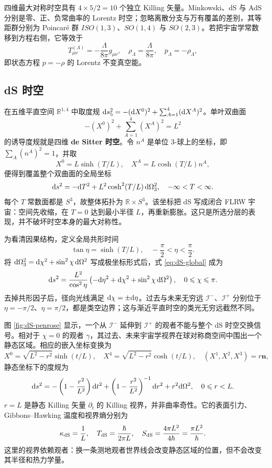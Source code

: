 四维最大对称时空具有 $4\times5/2=10$ 个独立 Killing 矢量。Minkowski、dS 与 AdS 分别是零、正、负常曲率的 Lorentz 时空；忽略离散分支与万有覆盖的差别，其等距群分别为 Poincar\'e 群 $ISO(1,3)$、$SO(1,4)$ 与 $SO(2,3)$。若把宇宙学常数移到方程右侧，它等效于
\[
    T^{(\Lambda)}_{\mu\nu}=-\frac{\Lambda}{8\pi}g_{\mu\nu},
    \quad
    \rho_\Lambda=\frac{\Lambda}{8\pi},\quad
    p_\Lambda=-\rho_\Lambda,
\]
即状态方程 $p=-\rho$ 的 Lorentz 不变真空能。

\subsection{dS 时空}

在五维平直空间 $\mathbb R^{1,4}$ 中取度规
$\dd s_5^2=-(\dd X^0)^2+\sum_{A=1}^4(\dd X^A)^2$。单叶双曲面
\begin{equation}\label{eq:dS-embedding}
    -(X^0)^2+\sum_{A=1}^4(X^A)^2=L^2
\end{equation}
的诱导度规就是四维 \textbf{de Sitter 时空}。令 $n^A$ 是单位 3-球上的坐标，即 $\sum_A(n^A)^2=1$，并取
\[
    X^0=L\sinh(T/L),\quad
    X^A=L\cosh(T/L)n^A,
\]
便得到覆盖整个双曲面的全局坐标
\begin{equation}\label{eq:dS-global}
    \dd s^2=-\dd T^2+L^2\cosh^2(T/L)\,\dd\Omega_3^2,
    \quad -\infty<T<\infty.
\end{equation}
每个 $T$ 常数面都是 $S^3$，故整体拓扑为 $\mathbb R\times S^3$。该坐标把 dS 写成闭合 FLRW 宇宙：空间先收缩，在 $T=0$ 达到最小半径 $L$，再重新膨胀。这只是所选分层的表现，并不破坏时空本身的最大对称性。

为看清因果结构，定义全局共形时间
\[
    \tan\eta=\sinh(T/L),\quad
    -\frac\pi2<\eta<\frac\pi2.
\]
将 $\dd\Omega_3^2=\dd\chi^2+\sin^2\chi\,\dd\Omega^2$ 写成极坐标形式后，式 \eqref{eq:dS-global} 成为
\begin{equation}
    \dd s^2=\frac{L^2}{\cos^2\eta}
      \left(-\dd\eta^2+\dd\chi^2+\sin^2\chi\,\dd\Omega^2\right),
    \quad 0\leqslant\chi\leqslant\pi.
\end{equation}
去掉共形因子后，径向光线满足 $\dd\chi=\pm\dd\eta$。过去与未来无穷远 $\mathscr I^-$、$\mathscr I^+$ 分别位于 $\eta=-\pi/2$、$\eta=\pi/2$，都是类空边界；这与渐近平直时空的类光无穷远截然不同。

图 \ref{fig:dS-penrose} 显示，一个从 $\mathscr I^-$ 延伸到 $\mathscr I^+$ 的观者不能与整个 dS 时空交换信号。相对于 $\chi=0$ 的观者 $\gamma$，其过去、未来宇宙学视界在球对称商空间中围出一个静态区域。相应的嵌入坐标变换为
\[
    X^0=\sqrt{L^2-r^2}\sinh(t/L),\quad
    X^4=\sqrt{L^2-r^2}\cosh(t/L),\quad
    (X^1,X^2,X^3)=r\bm n,
\]
静态坐标下的度规为
\begin{equation}
    \dd s^2=-\left(1-\frac{r^2}{L^2}\right)\dd t^2
      +\left(1-\frac{r^2}{L^2}\right)^{-1}\dd r^2+r^2\dd\Omega^2,
    \quad 0\leqslant r<L.
\end{equation}
$r=L$ 是静态 Killing 矢量 $\partial_t$ 的 Killing 视界，并非曲率奇性。它的表面引力、Gibbons--Hawking 温度和视界熵分别为
\begin{equation}
    \kappa_{\rm dS}=\frac1L,
    \quad T_{\rm dS}=\frac{\hbar}{2\pi L},
    \quad S_{\rm dS}=\frac{4\pi L^2}{4\hbar}=\frac{\pi L^2}{\hbar}.
\end{equation}
这里的视界依赖观者：换一条测地观者世界线会改变静态区域的位置，但不会改变其半径和热力学量。

